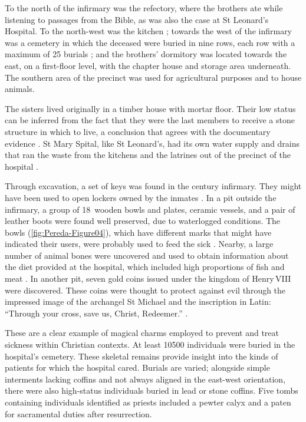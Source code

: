 To the north of the infirmary was the refectory, where the brothers ate while listening to passages from the Bible, as was also the case at St Leonard’s Hospital. 
To the north-west was the kitchen \parencites[51]{Phillpotts_1997}[100]{Thomas_2002}; 
towards the west of the infirmary was a cemetery in which the deceased were buried in nine rows, each row with a maximum of 25 burials \parencite[59]{White_2007}; and the brothers’ dormitory was located towards the east, on a first-floor level, with the chapter house and storage area underneath. The southern area of the precinct was used for agricultural purposes and to house animals.

The sisters lived originally in a timber house with mortar floor. Their low status can be inferred from the fact that they were the last members to receive a stone structure in which to live, a conclusion that agrees with the documentary evidence \parencites[36]{Phillpotts_1997}[51]{Rawcliffe_1999}[151]{Thomas_2002}.
St Mary Spital, like St Leonard’s, had its own water supply and drains that ran the waste from the kitchens and the latrines out of the precinct of the hospital \parencite[151]{Thomas_2002}. 
\IJSRAseparator

Through excavation, a set of keys was found in the  century infirmary. They might have been used to open lockers owned by the inmates \parencite[99]{Thomas_2002}. In a pit outside the infirmary, a group of 18~wooden bowls and plates, ceramic vessels, and a pair of leather boots were found well preserved, due to waterlogged conditions. The bowls (\cref{fig:Pereda-Figure04}), %
which have different marks that might have indicated their users, were probably used to feed the sick \parencites[68]{Egan_2007}[99]{Thomas_2002}. 
Nearby, a large number of animal bones were uncovered and used to obtain information about the diet provided at the hospital, which included high proportions of fish and meat \parencite[59,113-114]{Phillpotts_1997}.
In another pit, seven gold coins issued under the kingdom of Henry\,VIII were discovered. These coins were thought to protect against evil through the impressed image of the archangel St Michael and the inscription in Latin: \enquote{Through your cross, save us, Christ, Redeemer.}  \parencite[70]{Egan_2007}. 

These are a clear example of magical charms employed to prevent and treat sickness within Christian contexts.
At least \num{10500} individuals were buried in the hospital’s cemetery. These skeletal remains provide insight into the kinds of patients for which the hospital cared.  Burials are varied; alongside simple interments lacking coffins and not always aligned in the east-west orientation, there were also high-status individuals buried in lead or stone coffins. Five tombs containing individuals identified as priests included a pewter calyx and a paten for sacramental duties after resurrection. 

